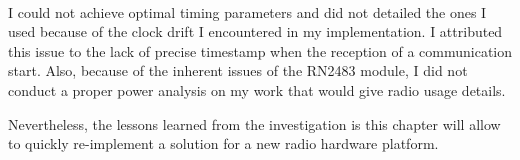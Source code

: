 \paragraph{}

I could not achieve optimal timing parameters and did not detailed the ones
I used because of the clock drift I encountered in my implementation.
I attributed this issue to the lack of precise timestamp when the reception of a communication start.
Also, because of the inherent issues of the RN2483 module,
I did not conduct a proper power analysis on my work that would give radio usage
details.

Nevertheless, the lessons learned from the investigation is this chapter will
allow to quickly re-implement a solution for a new radio hardware platform.
